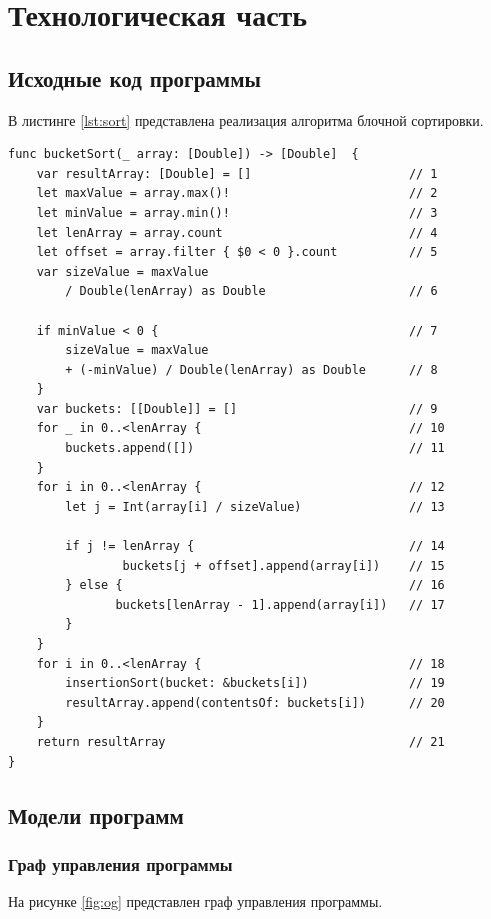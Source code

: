 \chapter{Технологическая часть}

\section{Исходные код программы}
В листинге \ref{lst:sort} представлена реализация алгоритма блочной сортировки.

\begin{lstlisting}[label=lst:sort, caption=Функция алгоритма блочной сортировки]
func bucketSort(_ array: [Double]) -> [Double]  {
    var resultArray: [Double] = [] 						// 1
    let maxValue = array.max()!							// 2
    let minValue = array.min()!							// 3
    let lenArray = array.count							// 4
    let offset = array.filter { $0 < 0 }.count			// 5
    var sizeValue = maxValue 
    	/ Double(lenArray) as Double					// 6
    
    if minValue < 0 { 									// 7
    	sizeValue = maxValue 
		+ (-minValue) / Double(lenArray) as Double 		// 8
    }
    var buckets: [[Double]] = []						// 9
    for _ in 0..<lenArray { 							// 10
    	buckets.append([]) 								// 11
    }
    for i in 0..<lenArray { 							// 12
        let j = Int(array[i] / sizeValue) 				// 13
        	
        if j != lenArray { 								// 14
        		buckets[j + offset].append(array[i])	// 15
        } else { 										// 16
               buckets[lenArray - 1].append(array[i]) 	// 17
        }
    }
    for i in 0..<lenArray {								// 18
        insertionSort(bucket: &buckets[i]) 				// 19
        resultArray.append(contentsOf: buckets[i]) 		// 20
    }
    return resultArray									// 21
}
\end{lstlisting}

\section{Модели программ}

\subsection{Граф управления программы}

На рисунке \ref{fig:og} представлен граф управления программы.


